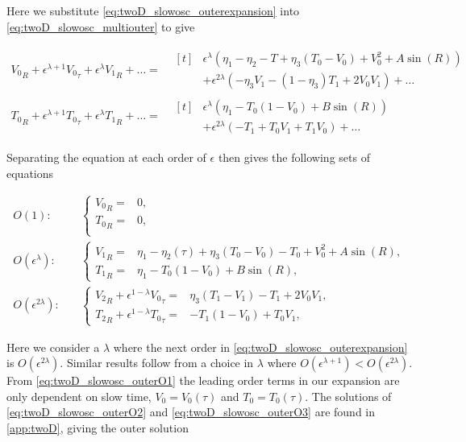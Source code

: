 Here we substitute \eqref{eq:twoD_slowosc_outerexpansion} into \eqref{eq:twoD_slowosc_multiouter} to give

\begin{equation*}
\begin{aligned}
{V_0}_R+\epsilon^{\lambda+1}{V_0}_\tau+\epsilon^\lambda {V_1}_R+\ldots=&\begin{aligned}[t]&
\epsilon^\lambda \left(\eta_1-\eta_2-T+\eta_3(T_0-V_0)+V_0^2+A\sin(R)\right)\\
&+\epsilon^{2\lambda}\left(-\eta_3 V_1-(1-\eta_3)T_1+2V_0V_1\right)+\ldots
\end{aligned}\\
{T_0}_R+\epsilon^{\lambda+1}{T_0}_\tau+\epsilon^\lambda {T_1}_R+\ldots=&\begin{aligned}[t]&
\epsilon^\lambda\left( \eta_1-T_0(1-V_0)+B\sin(R)\right)\\
&+\epsilon^{2\lambda}\left(-T_1+T_0V_1+T_1V_0\right)+\ldots
\end{aligned}
\end{aligned}
\end{equation*}

Separating the equation at each order of $\epsilon$ then gives the following sets of equations

\begin{align}
\label{eq:twoD_slowosc_outerO1}
O(1):\quad & \begin{cases}
	{V_0}_R =& 0, \\
	{T_0}_R =& 0,\\
\end{cases}\\
\label{eq:twoD_slowosc_outerO2}
O(\epsilon^\lambda):\quad & \begin{cases}
	{V_1}_R = & \eta_1-\eta_2(\tau) +\eta_3(T_0-V_0)-T_0+V_0^2+A\sin(R),\\
	{T_1}_R =& \eta_1-T_0(1-V_0)+B\sin(R),
\end{cases}\\
\label{eq:twoD_slowosc_outerO3}
O(\epsilon^{2\lambda}):\quad & \begin{cases}
	{V_2}_R+\epsilon^{1-\lambda}{V_0}_\tau = & \eta_3(T_1-V_1)-T_1+2V_0V_1,\\
	{T_2}_R +\epsilon^{1-\lambda}{T_0}_\tau =& -T_1(1-V_0)+T_0V_1,
\end{cases}
\end{align}

Here we consider a $\lambda$ where the next order in \eqref{eq:twoD_slowosc_outerexpansion} is $O(\epsilon^{2\lambda})$. Similar results follow from a choice in $\lambda$ where $O(\epsilon^{\lambda+1})<O(\epsilon^{2\lambda})$. From \eqref{eq:twoD_slowosc_outerO1} the leading order terms in our expansion are only dependent on slow time, $V_0=V_0(\tau)$ and $T_0=T_0(\tau)$. The solutions of \eqref{eq:twoD_slowosc_outerO2} and \eqref{eq:twoD_slowosc_outerO3} are found in \autoref{app:twoD}, giving the outer solution 

